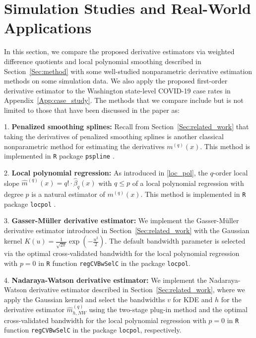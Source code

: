 \documentclass{uwstat572}
\theoremstyle{definition}
\renewcommand{\hat}{\widehat}
\theoremstyle{theorem}
\begin{document}
\section{Simulation Studies and Real-World Applications}
\label{Sec:experiments}

In this section, we compare the proposed derivative estimators via weighted difference quotients and local polynomial smoothing described in Section~\ref{Sec:method} with some well-studied nonparametric derivative estimation methods on some simulation data. We also apply the proposed first-order derivative estimator to the Washington state-level COVID-19 case rates in Appendix~\ref{App:case_study}. The methods that we compare include but is not limited to those that have been discussed in the paper as:
	
1. {\bf Penalized smoothing splines:} Recall from Section~\ref{Sec:related_work} that taking the derivatives of penalized smoothing splines is another classical nonparametric method for estimating the derivatives $m^{(q)}(x)$. This method is implemented in \texttt{R} package \texttt{pspline} \citep{pspline2022R}.

2. {\bf Local polynomial regression:} As introduced in \eqref{loc_pol}, the $q$-order local slope $\hat{m}^{(q)}(x) = q!\cdot\hat{\beta}_q(x)$ with $q\leq p$ of a local polynomial regression with degree $p$ is a natural estimator of $m^{(q)}(x)$. This method is implemented in \texttt{R} package \texttt{locpol} \citep{locpol2022R}.
	
3. {\bf Gasser-M{\"u}ller derivative estimator:} We implement the Gasser-M{\"u}ller derivative estimator introduced in Section~\ref{Sec:related_work} with the Gaussian kernel $K(u)=\frac{1}{\sqrt{2\pi}} \exp\left(-\frac{u^2}{2}\right)$. The default bandwidth parameter is selected via the optimal cross-validated bandwidth for the local polynomial regression with $p=0$ in \texttt{R} function \texttt{regCVBwSelC} in the package \texttt{locpol}.
	
4. {\bf Nadaraya-Watson derivative estimator:} We implement the Nadaraya-Watson derivative estimator described in Section~\ref{Sec:related_work}, where we apply the Gaussian kernel and select the bandwidths $v$ for KDE and $h$ for the derivative estimator $\hat{m}_{h,NW}^{(q)}$ using the two-stage plug-in method \citep{sheather1991reliable} and the optimal cross-validated bandwidth for the local polynomial regression with $p=0$ in \texttt{R} function \texttt{regCVBwSelC} in the package \texttt{locpol}, respectively.
\end{document}
